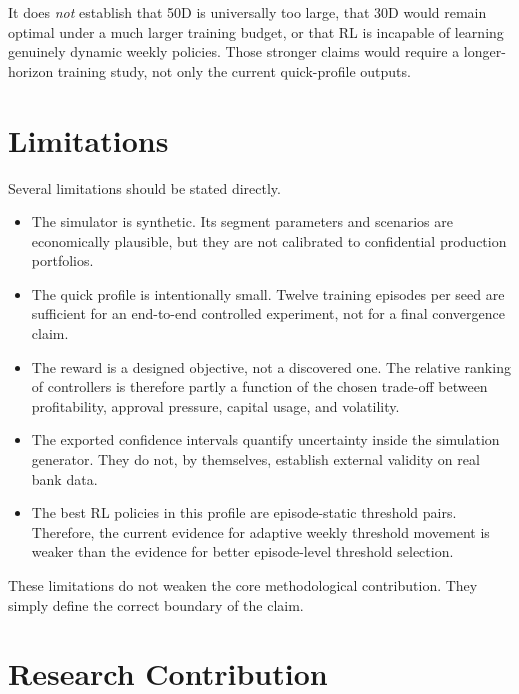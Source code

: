 \documentclass[12pt,a4paper]{article}
\begin{document}
It does \emph{not} establish that 50D is universally too large, that 30D would remain optimal under a much larger training budget, or that RL is incapable of learning genuinely dynamic weekly policies. Those stronger claims would require a longer-horizon training study, not only the current quick-profile outputs.

\section{Limitations}

Several limitations should be stated directly.
\begin{itemize}[leftmargin=*]
    \item The simulator is synthetic. Its segment parameters and scenarios are economically plausible, but they are not calibrated to confidential production portfolios.
    \item The quick profile is intentionally small. Twelve training episodes per seed are sufficient for an end-to-end controlled experiment, not for a final convergence claim.
    \item The reward is a designed objective, not a discovered one. The relative ranking of controllers is therefore partly a function of the chosen trade-off between profitability, approval pressure, capital usage, and volatility.
    \item The exported confidence intervals quantify uncertainty inside the simulation generator. They do not, by themselves, establish external validity on real bank data.
    \item The best RL policies in this profile are episode-static threshold pairs. Therefore, the current evidence for adaptive weekly threshold movement is weaker than the evidence for better episode-level threshold selection.
\end{itemize}

These limitations do not weaken the core methodological contribution. They simply define the correct boundary of the claim.

\section{Research Contribution}
\end{document}

